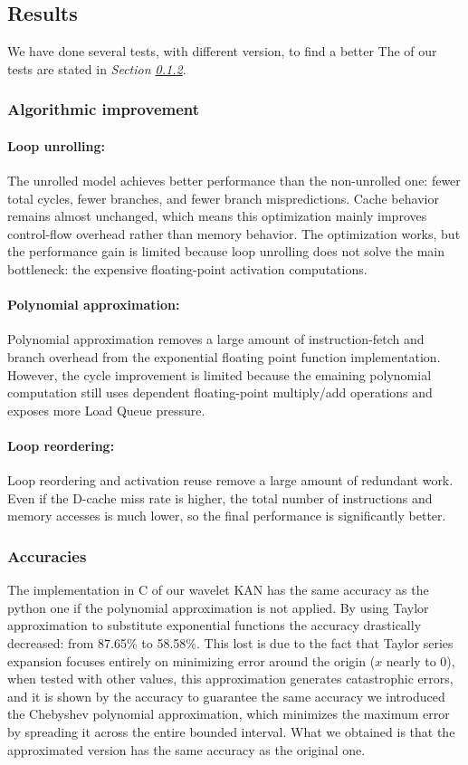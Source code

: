 \documentclass[11pt,a4paper,twocolumn]{article}
\begin{document}
\subsection{Results}
\label{subsec:Gem5_results}
We have done several tests, with different version, to find a better 
The \textit{} of our tests are stated in \textit{Section \ref{subsubsec:Gem5_accuracies}}.

\subsubsection{Algorithmic improvement}
\paragraph{Loop unrolling:} The unrolled model achieves better performance 
than the non-unrolled one: fewer total cycles, fewer branches, and fewer 
branch mispredictions. Cache behavior remains almost unchanged, which 
means this optimization mainly improves control-flow overhead rather than 
memory behavior.
The optimization works, but the performance gain is limited because loop 
unrolling does not solve the main bottleneck: the expensive floating-point 
activation computations.
\paragraph{Polynomial approximation:} Polynomial approximation removes a 
large amount of instruction-fetch and branch overhead from the exponential 
floating point function implementation. However, the cycle improvement is 
limited because the emaining polynomial computation still uses dependent 
floating-point multiply/add operations and exposes more Load Queue pressure.
\paragraph{Loop reordering:} Loop reordering and activation reuse remove a 
large amount of redundant work. Even if the D-cache miss rate is higher, 
the total number of instructions and memory accesses is much lower, so the 
final performance is significantly better.
\subsubsection{Accuracies}
\label{subsubsec:Gem5_accuracies}
The implementation in C of our wavelet KAN has 
the same accuracy as the python one if the polynomial approximation 
is not applied. By using Taylor approximation to substitute exponential 
functions the accuracy drastically decreased: from 87.65\% to 58.58\%. 
This lost is due to the fact that Taylor series expansion focuses entirely 
on minimizing error around the origin ($x$ nearly to $0$), when tested 
with other values, this approximation generates catastrophic errors, 
and it is shown by the accuracy to guarantee the same accuracy we 
introduced the Chebyshev polynomial approximation, which minimizes the 
maximum error by spreading it across the entire bounded interval. What 
we obtained is that the approximated version has the same accuracy as 
the original one.
\end{document}
